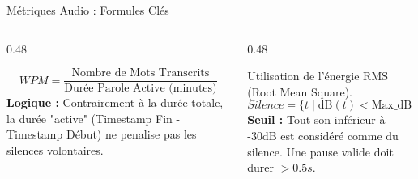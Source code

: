 \documentclass[10pt,aspectratio=169]{beamer}
\begin{document}
\begin{frame}{Métriques Audio : Formules Clés}
    \begin{columns}[T]
        \begin{column}{0.48\textwidth}
            \begin{tcolorbox}[title=Débit de Parole (WPM), colframe=primary!40]
                \footnotesize
                $$ WPM = \frac{\text{Nombre de Mots Transcrits}}{\text{Durée Parole Active (minutes)}} $$
                \vspace{0.2cm}
                \textbf{Logique :} Contrairement à la durée totale, la durée "active" (Timestamp Fin - Timestamp Début) ne penalise pas les silences volontaires.
            \end{tcolorbox}
        \end{column}
        \begin{column}{0.48\textwidth}
            \begin{tcolorbox}[title=Détection de Pause, colframe=accent!40]
                \footnotesize
                Utilisation de l'énergie RMS (Root Mean Square).
                $$ Silence = \{ t \mid \text{dB}(t) < \text{Max\_dB} - 30 \} $$
                \vspace{0.2cm}
                \textbf{Seuil :} Tout son inférieur à -30dB est considéré comme du silence. Une pause valide doit durer $> 0.5s$.
            \end{tcolorbox}
        \end{column}
    \end{columns}
\end{frame}
\end{document}
